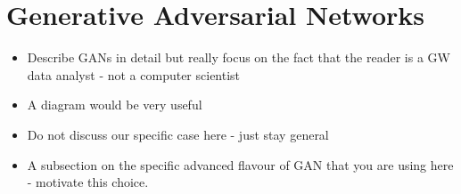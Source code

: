 \documentclass[%
 reprint,
 amsmath,amssymb,
 aps,
]{revtex4-2}
\begin{document}
\begin{comment}
The detections of gravitational waves by Advanced Laser Interferometer
Gravitational wave Observatory (aLIGO) and Advanced Virgo [1–5], have opened up
new avenues to explore the Universe. Astrophysical sources of transient
gravitational waves include the merging of compact binary star systems like
black holes and/or neutron stars [6], core-collapse supernova [7], pulsar
glitches [8] and other events involving accelerating massive objects.
Gravitational wave bursts (GWBs) are an exciting area of research as the
emissions process of such waves is not well understood. The waveforms often
depend on complicated orbital dynamics and equations of state which limit the
sensitivity on searching for burst sources. Typically, the duration of burst
signals are short with amplitudes that can be greater than the detector noise.
Burst searches look for excess power contained in a time-frequency plot and
rely on consistent arrival times, waveform shapes and frequencies between
detectors. We focus on utilising an unsupervised form of machine learning
called Generative Adversarial Networks [9] as a generalised GW transient
search. A two detector case is considered such that the signals retain their
form between detections and a defined time delay between detections relating to
the sky orientation of the source.
\end{comment}

\section{Generative Adversarial Networks}

\begin{itemize}
\item Describe GANs in detail but really focus on the fact that the reader is a
GW data analyst - not a computer scientist
\item A diagram would be very useful
\item Do not discuss our specific case here - just stay general
\item A subsection on the specific advanced flavour of GAN that you are using
here - motivate this choice.
\end{itemize}
\end{document}
